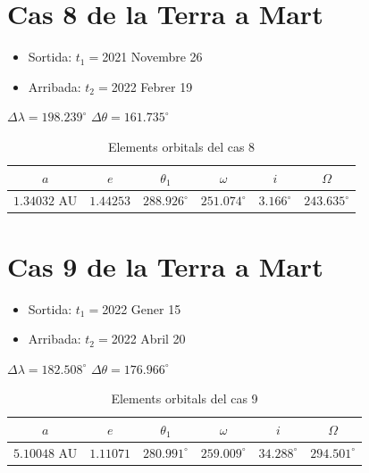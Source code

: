 \section{Cas 8 de la Terra a Mart}
\begin{itemize}
	\item Sortida: $t_{1}=$2021 Novembre 26
	\item Arribada: $t_{2}=$2022 Febrer 19
\end{itemize}
$\Delta\lambda=198.239^{\circ}$
$\Delta\theta=161.735^{\circ}$
\begin{table}[h!]
	\centering
	\begin{tabular}{ |c|c|c|c|c|c|}
		\hline
		$a$ & $e$ & $\theta_{1}$ & $\omega$ & $i$ & $\Omega$ \\ \hline
		$1.34032$ AU  & $1.44253$ & $288.926^{\circ}$ & $251.074^{\circ}$ & $3.166^{\circ}$ & $243.635^{\circ}$ \\ \hline
	\end{tabular}
	\caption{Elements orbitals del cas 8}
\end{table}

\section{Cas 9 de la Terra a Mart}
\begin{itemize}
	\item Sortida: $t_{1}=$2022 Gener 15
	\item Arribada: $t_{2}=$2022 Abril 20
\end{itemize}
$\Delta\lambda=182.508^{\circ}$
$\Delta\theta=176.966^{\circ}$
\begin{table}[h!]
	\centering
	\begin{tabular}{ |c|c|c|c|c|c|}
		\hline
		$a$ & $e$ & $\theta_{1}$ & $\omega$ & $i$ & $\Omega$ \\ \hline
		$5.10048$ AU  & $1.11071$ & $280.991^{\circ}$ & $259.009^{\circ}$ & $34.288^{\circ}$ & $294.501^{\circ}$ \\ \hline
	\end{tabular}
	\caption{Elements orbitals del cas 9}
\end{table}